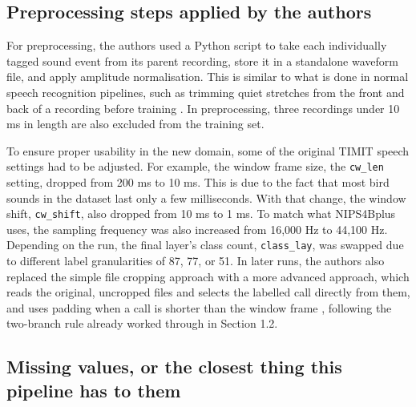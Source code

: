 \documentclass[11pt]{article}
\begin{document}
\subsection{Preprocessing steps applied by the authors}

For preprocessing, the authors used a Python script to take each individually tagged sound event from its parent recording, store it in a standalone waveform file, and apply amplitude normalisation. This is similar to what is done in normal speech recognition pipelines, such as trimming quiet stretches from the front and back of a recording before training \citep{bravosanchez2021}. In preprocessing, three recordings under 10 ms in length are also excluded from the training set.

To ensure proper usability in the new domain, some of the original TIMIT speech settings had to be adjusted. For example, the window frame size, the \texttt{cw\_len} setting, dropped from 200 ms to 10 ms. This is due to the fact that most bird sounds in the dataset last only a few milliseconds. With that change, the window shift, \texttt{cw\_shift}, also dropped from 10 ms to 1 ms. To match what NIPS4Bplus uses, the sampling frequency was also increased from 16,000 Hz to 44,100 Hz. Depending on the run, the final layer's class count, \texttt{class\_lay}, was swapped due to different label granularities of 87, 77, or 51. In later runs, the authors also replaced the simple file cropping approach with a more advanced approach, which reads the original, uncropped files and selects the labelled call directly from them, and uses padding when a call is shorter than the window frame \citep{bravosanchez2021}, following the two-branch rule already worked through in Section 1.2.

\subsection{Missing values, or the closest thing this pipeline has to them}
\end{document}
